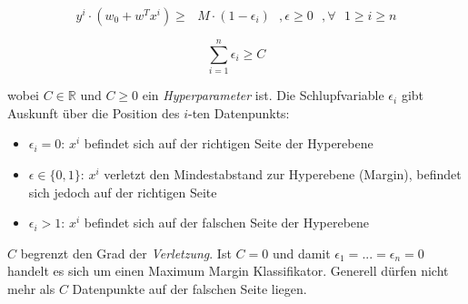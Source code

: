 \documentclass{report}
\begin{document}
  $$y^i\cdot(w_0 + w^Tx^i)\geq \text{ }M\cdot(1 - \epsilon_i)\text{ },\epsilon\geq 0\text{ }, \forall\text{ }1\geq i\geq n$$	
  
  $$\sum_{i=1}^n\epsilon_i\geq C$$	
  
  wobei $C\in \mathbb{R}$ und $C \geq 0$ ein \textit{Hyperparameter} ist. Die Schlupfvariable $\epsilon_i$ gibt Auskunft über	
  die Position des $i$-ten Datenpunkts:\\	
  \vspace*{-1.5em}	
  \begin{itemize}	
    \item $\epsilon_i = 0$: $x^i$ befindet sich auf der richtigen Seite der Hyperebene	
    \item $\epsilon\in\{0,1\}$: $x^i$ verletzt den Mindestabstand zur Hyperebene (Margin), befindet sich jedoch auf der richtigen Seite	
    \item $\epsilon_i > 1$: $x^i$ befindet sich auf der falschen Seite der Hyperebene	
  \end{itemize}	
  
  $C$ begrenzt den Grad der \textit{Verletzung}. Ist $C=0$ und damit $\epsilon_1 = ... = \epsilon_n = 0$ handelt es sich um einen	
  Maximum Margin Klassifikator. Generell dürfen nicht mehr als $C$ Datenpunkte auf der falschen Seite liegen.	
  
\end{document}
